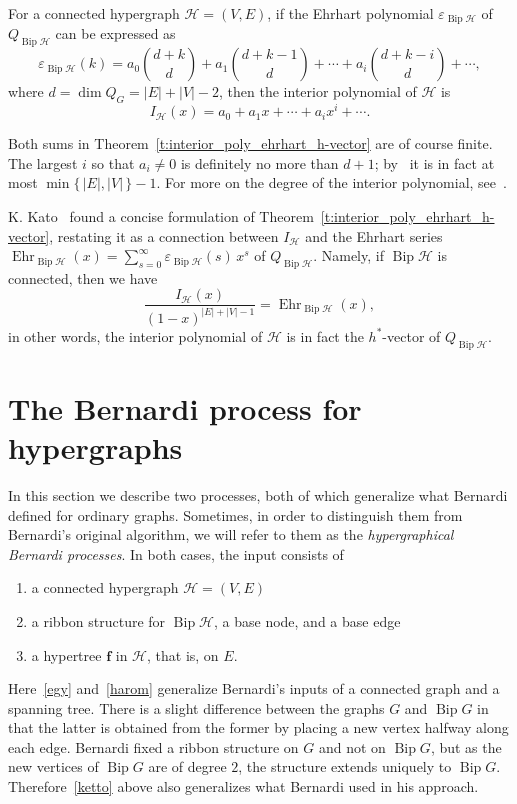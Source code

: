 \documentclass[ALCO,ThmDefs,Unicode,epreuves]{cedram}
\newcommand{\HH}{\mathcal H}
\DeclareMathOperator{\bip}{Bip}
\DeclareMathOperator{\Ehr}{Ehr}
\begin{document}
\begin{theo}
\label{t:interior_poly_ehrhart_h-vector}
For a connected hypergraph $\HH=(V,E)$, if the Ehrhart polynomial $\varepsilon_{\bip \HH}$ of $Q_{\bip \HH}$ can be expressed as 
\begin{equation*}
\varepsilon_{\bip \HH}(k)=a_0\binom{d+k}{d}+a_1\binom{d+k-1}{d}+\cdots+a_i\binom{d+k-i}{d}+\cdots,
\end{equation*}
where $d=\dim Q_G=|E|+|V|-2$, then the interior polynomial of $\HH$ is 
\[I_{\HH}(x)=a_0+a_1x+\cdots+a_ix^i+\cdots.\]
\end{theo}

Both sums in Theorem~\ref{t:interior_poly_ehrhart_h-vector} are of course finite. The largest $i$ so that $a_i\ne0$ is definitely no more than $d+1$; by~\cite[Proposition~6.1]{hiperTutte} it is in fact at most $\min\{\,|E|,|V|\,\}-1$. For more on the degree of the interior polynomial, see~\cite{Frank-K}.

K. Kato~\cite{Kato} found a concise formulation of Theorem~\ref{t:interior_poly_ehrhart_h-vector}, restating it as a connection between $I_\HH$ and the Ehrhart series $\Ehr_{\bip \HH}(x)=\sum_{s=0}^\infty\varepsilon_{\bip \HH}(s)\,x^s$ of $Q_{\bip\HH}$. Namely, if $\bip\HH$ is connected, then we have
\[\frac{I_\HH(x)}{(1-x)^{|E|+|V|-1}}=\Ehr _{\bip \HH}(x),\]
in other words, the interior polynomial of $\HH$ is in fact the $h^*$-vector of $Q_{\bip\HH}$.


\section{The Bernardi process for hypergraphs}
\label{sec:Bernardi-process}

In this section we describe two 
processes, both of which generalize what Bernardi defined for ordinary graphs. Sometimes, in order to distinguish them from Bernardi's original algorithm, we will refer to them as the \emph{hypergraphical Bernardi processes}. In both cases, the input consists of 
\begin{enumerate}[label=(\alph*)]
\item\label{egy} a connected hypergraph $\HH=(V,E)$
\item\label{ketto} a ribbon structure for $\bip\HH$, a base node, and a base edge
\item\label{harom} a hypertree $\mathbf f$ in $\HH$, that is, on $E$.
\end{enumerate}
Here~\ref{egy} and~\ref{harom} generalize Bernardi's inputs of a connected graph and a spanning tree. There is a slight difference between the graphs $G$ and $\bip G$ in that the latter is obtained from the former by placing a new vertex halfway along each edge. Bernardi fixed a ribbon structure on $G$ and not on $\bip G$, but as the new vertices of $\bip G$ are of degree $2$, the structure extends uniquely to $\bip G$. Therefore~\ref{ketto} above also generalizes what Bernardi used in his approach.
 
\end{document}
